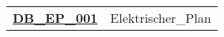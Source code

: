\begin{longtable}{rl}
	
	
	
	\textbf{\hyperref[dbep001]{DB\_EP\_001}} 		& Elektrischer\_Plan \\
	
	
\end{longtable}

